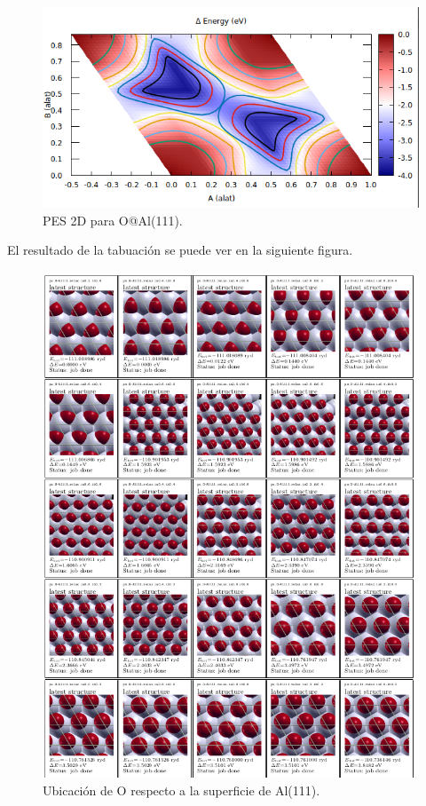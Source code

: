     \begin{figure}[H]
        \centering
        \includegraphics[scale = 0.45]{figs/D3/PES_2D.png}
        \caption{PES 2D para O@Al(111).}
    \end{figure}

  El resultado de la tabuación se puede ver en la siguiente figura.

  \begin{figure}[H]
      \centering
      \includegraphics[scale = 0.7]{figs/D3/tabulate.png}
      \caption{Ubicación de O respecto a la superficie de Al(111).}
  \end{figure}

